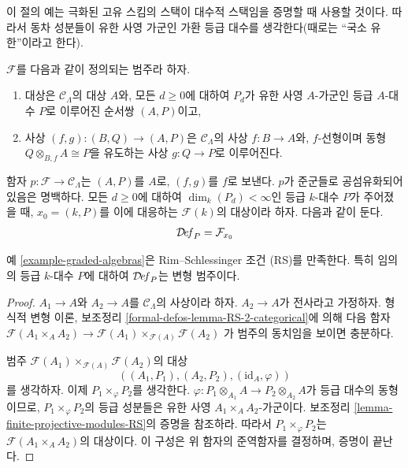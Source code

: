 \noindent
이 절의 예는 극화된 고유 스킴의 스택이 대수적 스택임을 증명할 때
사용할 것이다. 따라서 동차 성분들이 유한 사영 가군인 가환 등급 대수를
생각한다(때로는 ``국소 유한''이라고 한다).

\begin{example}[등급 대수]
\label{example-graded-algebras}
$\mathcal{F}$를 다음과 같이 정의되는 범주라 하자.
\begin{enumerate}
\item 대상은 $\mathcal{C}_\Lambda$의 대상 $A$와, 모든 $d \geq 0$에 대하여
$P_d$가 유한 사영 $A$-가군인 등급 $A$-대수 $P$로 이루어진 순서쌍
$(A, P)$이고,
\item 사상 $(f, g) : (B, Q) \to (A, P)$은
$\mathcal{C}_\Lambda$의 사상 $f : B \to A$와, $f$-선형이며
동형 $Q \otimes_{B, f} A \cong P$을 유도하는 사상
$g : Q \to P$로 이루어진다.%
\end{enumerate}
함자 $p : \mathcal{F} \to \mathcal{C}_\Lambda$는 $(A, P)$를 $A$로,
$(f, g)$를 $f$로 보낸다. $p$가 준군들로 공섬유화되어 있음은 명백하다.
모든 $d \geq 0$에 대하여 $\dim_k(P_d) < \infty$인 등급 $k$-대수 $P$가
주어졌을 때, $x_0 = (k, P)$를 이에 대응하는 $\mathcal{F}(k)$의 대상이라
하자. 다음과 같이 둔다.
$$
\mathcal{D}\!\mathit{ef}_P = \mathcal{F}_{x_0}
$$
\end{example}

\begin{lemma}
\label{lemma-graded-algebras-RS}
예 \ref{example-graded-algebras}은 Rim--Schlessinger 조건 (RS)를
만족한다. 특히 임의의 등급 $k$-대수 $P$에 대하여
$\mathcal{D}\!\mathit{ef}_P$는 변형 범주이다.
\end{lemma}

\begin{proof}
$A_1 \to A$와 $A_2 \to A$를 $\mathcal{C}_\Lambda$의 사상이라 하자.
$A_2 \to A$가 전사라고 가정하자. 형식적 변형 이론, 보조정리
\ref{formal-defos-lemma-RS-2-categorical}에 의해 다음 함자
$\mathcal{F}(A_1 \times_A A_2) \to
\mathcal{F}(A_1) \times_{\mathcal{F}(A)} \mathcal{F}(A_2)$
가 범주의 동치임을 보이면 충분하다.

\medskip\noindent
범주 $\mathcal{F}(A_1) \times_{\mathcal{F}(A)} \mathcal{F}(A_2)$의 대상
$$
((A_1, P_1), (A_2, P_2), (\text{id}_A, \varphi))
$$
를 생각하자. 이제 $P_1 \times_\varphi P_2$를 생각한다.
$\varphi : P_1 \otimes_{A_1} A \to P_2 \otimes_{A_2} A$가 등급 대수의
동형이므로, $P_1 \times_\varphi P_2$의 등급 성분들은 유한 사영
$A_1 \times_A A_2$-가군이다. 보조정리
\ref{lemma-finite-projective-modules-RS}의 증명을 참조하라. 따라서
$P_1 \times_\varphi P_2$는 $\mathcal{F}(A_1 \times_A A_2)$의 대상이다.
이 구성은 위 함자의 준역함자를 결정하며, 증명이 끝난다.
\end{proof}

